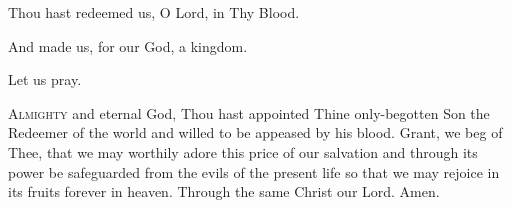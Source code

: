 
\begin{hangparas}{1em}{-1}
\parskip0mm
\Vbar Thou hast redeemed us, O Lord, in Thy Blood.

\Rbar And made us, for our God, a kingdom. 
\end{hangparas}

{\centering Let us pray.\par}

\lettrine{A}{lmighty} and eternal God, Thou hast appointed Thine only-begotten Son
the Redeemer of the world and willed to be appeased by his blood.
Grant, we beg of Thee, that we may worthily adore this price of our
salvation and through its power be safeguarded from the evils of the
present life so that we may rejoice in its fruits forever in heaven.
Through the same Christ our Lord.
\Rbar Amen.
